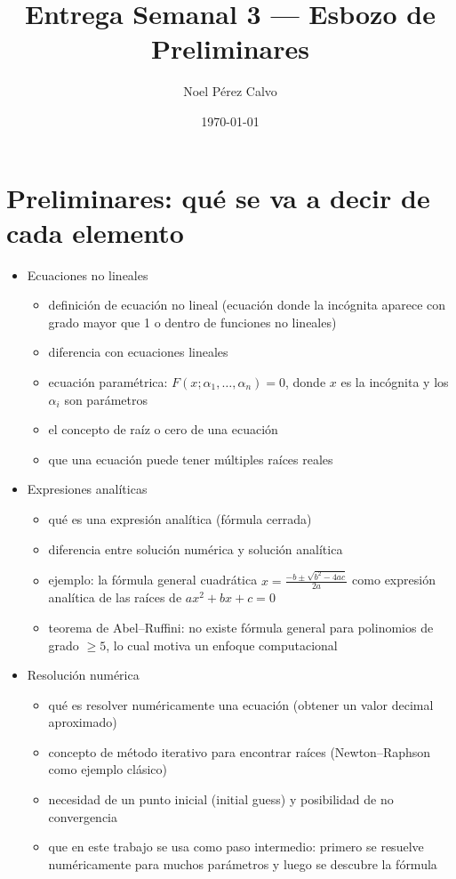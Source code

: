 \documentclass{article}
\title{Entrega Semanal 3 --- Esbozo de Preliminares} \author{Noel Pérez Calvo} \date{\today}
\begin{document}
\maketitle

\section*{Preliminares: qué se va a decir de cada elemento}

\begin{itemize}[leftmargin=1.5em]

  \item Ecuaciones no lineales
  \begin{itemize}
\item definición de ecuación no lineal (ecuación donde la incógnita aparece con grado mayor que 1 o dentro de funciones no lineales) \item diferencia con ecuaciones lineales \item ecuación paramétrica: $F(x; \alpha_1, \ldots, \alpha_n) = 0$, donde $x$ es la incógnita y los $\alpha_i$ son parámetros \item el concepto de raíz o cero de una ecuación \item que una ecuación puede tener múltiples raíces reales
  \end{itemize}

  \item Expresiones analíticas
  \begin{itemize}
\item qué es una expresión analítica (fórmula cerrada) \item diferencia entre solución numérica y solución analítica \item ejemplo: la fórmula general cuadrática $x = \frac{-b \pm \sqrt{b^2 - 4ac}}{2a}$ como expresión analítica de las raíces de $ax^2+bx+c=0$ \item teorema de Abel--Ruffini: no existe fórmula general para polinomios de grado $\geq 5$, lo cual motiva un enfoque computacional
  \end{itemize}

  \item Resolución numérica
  \begin{itemize}
\item qué es resolver numéricamente una ecuación (obtener un valor decimal aproximado) \item concepto de método iterativo para encontrar raíces (Newton--Raphson como ejemplo clásico) \item necesidad de un punto inicial (initial guess) y posibilidad de no convergencia \item que en este trabajo se usa como paso intermedio: primero se resuelve numéricamente para muchos parámetros y luego se descubre la fórmula
  \end{itemize}


\end{itemize}
\end{document}
